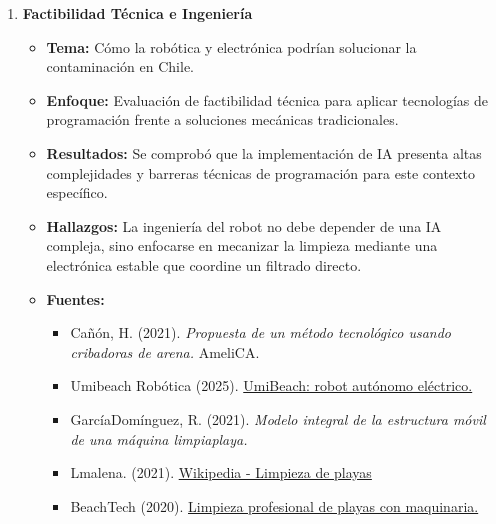\documentclass[12pt,a4paper]{article}
\begin{document}
\begin{enumerate}[label=\textbf{\Large\arabic*.}, leftmargin=0pt, labelsep=10pt]
	\item \textbf{Factibilidad Técnica e Ingeniería}
	      \begin{itemize}[label=\textbullet]
		      \item \textbf{Tema:} Cómo la robótica y electrónica podrían solucionar la contaminación en Chile.
		      \item \textbf{Enfoque:} Evaluación de factibilidad técnica para aplicar tecnologías de programación frente a soluciones mecánicas tradicionales.
		      \item \textbf{Resultados:} Se comprobó que la implementación de IA presenta altas complejidades y barreras técnicas de programación para este contexto específico.
		      \item \textbf{Hallazgos:} La ingeniería del robot no debe depender de una IA compleja, sino enfocarse en mecanizar la limpieza mediante una electrónica estable que coordine un filtrado directo.
		      \item \textbf{Fuentes:}
		            \begin{small}
			            \begin{itemize}[label=-]
				            \item Cañón, H. (2021). \textit{Propuesta de un método tecnológico usando cribadoras de arena.} AmeliCA.
				            \item Umibeach Robótica (2025). \href{https://www.umibeach.estuplanetasostenible}{UmiBeach: robot autónomo eléctrico.}
				            \item GarcíaDomínguez, R. (2021). \textit{Modelo integral de la estructura móvil de una máquina limpiaplaya.}
                            \item Lmalena. (2021). \href{https://es.wikipedia.org/wiki/Limpieza_de_playas}{Wikipedia - Limpieza de playas}
				            \item BeachTech (2020). \href{https://www.beach-tech.com}{Limpieza profesional de playas con maquinaria.}
			            \end{itemize}
		            \end{small}
	      \end{itemize}


\end{enumerate}
\end{document}
